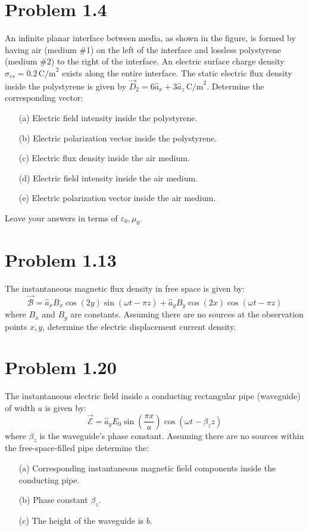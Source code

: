 \documentclass[12pt]{article}
\begin{document}
\section*{Problem 1.4}
An infinite planar interface between media, as shown in the figure, is formed by having air (medium \#1) on the left of the interface and lossless polystyrene (medium \#2) to the right of the interface. An electric surface charge density \( \sigma_{es} = 0.2 \, \text{C/m}^2 \) exists along the entire interface. The static electric flux density inside the polystyrene is given by \( \vec{D}_2 = 6\hat{a}_x + 3\hat{a}_z \, \text{C/m}^2 \).
Determine the corresponding vector:
\begin{itemize}
    \item[(a)] Electric field intensity inside the polystyrene.
    \item[(b)] Electric polarization vector inside the polystyrene.
    \item[(c)] Electric flux density inside the air medium.
    \item[(d)] Electric field intensity inside the air medium.
    \item[(e)] Electric polarization vector inside the air medium.
\end{itemize}
Leave your answers in terms of \( \varepsilon_0, \mu_0 \).

\section*{Problem 1.13}
The instantaneous magnetic flux density in free space is given by:
\[
\vec{\mathcal{B}} = \hat{a}_x B_x \cos(2y) \sin(\omega t - \pi z) + \hat{a}_y B_y \cos(2x) \cos(\omega t - \pi z)
\]
where \( B_x \) and \( B_y \) are constants. Assuming there are no sources at the observation points \( x, y \), determine the electric displacement current density.

\section*{Problem 1.20}
The instantaneous electric field inside a conducting rectangular pipe (waveguide) of width \( a \) is given by:
\[
\vec{\mathcal{E}} = \hat{a}_y E_0 \sin\left(\frac{\pi x}{a}\right) \cos(\omega t - \beta_z z)
\]
where \( \beta_z \) is the waveguide's phase constant. Assuming there are no sources within the free-space-filled pipe determine the:
\begin{itemize}
\item[(a)] Corresponding instantaneous magnetic field components inside the conducting pipe.
\item[(b)] Phase constant \( \beta_z \).
\item[(c)] The height of the waveguide is \( b \).
\end{itemize}
\end{document}
